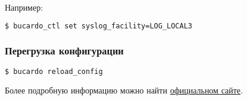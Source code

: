 Например:

\begin{lstlisting}[language=Bash,label=lst:bucardo15,caption=Изменения значений конфигурации]
$ bucardo_ctl set syslog_facility=LOG_LOCAL3
\end{lstlisting}

\subsubsection{Перегрузка конфигурации}

\begin{lstlisting}[language=Bash,label=lst:bucardo16,caption=Перегрузка конфигурации]
$ bucardo reload_config
\end{lstlisting}

Более подробную информацию можно найти \href{http://bucardo.org/}{официальном сайте}.
